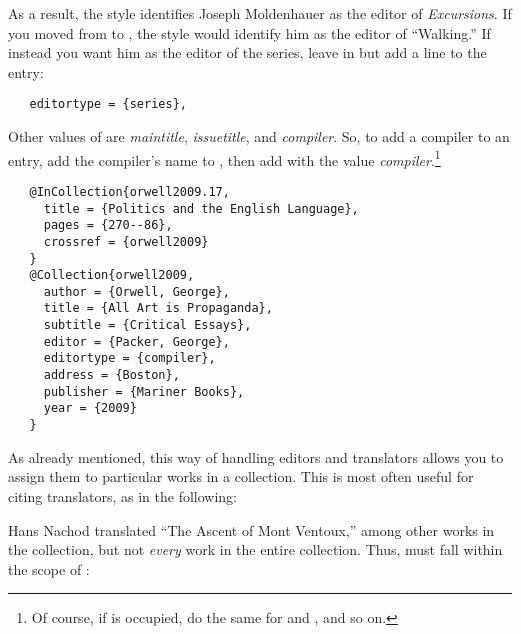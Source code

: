 \documentclass[11pt,letterpaper,oneside]{article}
\begin{document}
\begin{citebib}
\item \cite{thoreau2007.7}
\end{citebib}

\noindent As a result, the style identifies Joseph Moldenhauer as the
editor of \textit{Excursions}. If you moved  from
 to , the
style would identify him as the editor of ``Walking.'' If instead you
want him as the editor of the series, leave  in
 but add a line to the entry:

\begin{verbatim}
   editortype = {series},
\end{verbatim}

Other values of  are \textit{maintitle},
\textit{issuetitle}, and \textit{compiler}. So, to add a compiler to
an entry, add the compiler's name to , then add
 with the value \textit{compiler}.\footnote{Of
course, if  is occupied, do the same for
 and , and so on.}

\begin{verbatim}
   @InCollection{orwell2009.17,
     title = {Politics and the English Language},
     pages = {270--86},
     crossref = {orwell2009}
   }
   @Collection{orwell2009,
     author = {Orwell, George},
     title = {All Art is Propaganda},
     subtitle = {Critical Essays},
     editor = {Packer, George},
     editortype = {compiler},
     address = {Boston},
     publisher = {Mariner Books},
     year = {2009}
   }
\end{verbatim}

\begin{citebib}
\item \cite{orwell2009.17}
\end{citebib}

As already mentioned, this way of handling editors and translators
allows you to assign them to particular works in a collection. This is
most often useful for citing translators, as in the following:

\begin{citebib}
\item \cite{petrarca1948}
\end{citebib}

\noindent Hans Nachod translated ``The Ascent of Mont Ventoux,'' among
other works in the collection, but not \textit{every} work in the
entire collection. Thus,  must fall within the
scope of :
\end{document}
